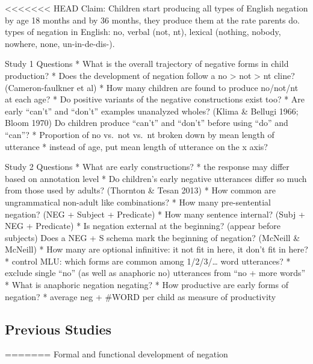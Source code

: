 \documentclass[man,floatsintext,draftall]{apa6}
\begin{document}
<<<<<<< HEAD
Claim: Children start producing all types of English negation by age 18
months and by 36 months, they produce them at the rate parents do. types
of negation in English: no, verbal (not, nt), lexical (nothing, nobody,
nowhere, none, un-in-de-dis-).

Study 1 Questions * What is the overall trajectory of negative forms in
child production? * Does the development of negation follow a no
\textgreater{} not \textgreater{} nt cline? (Cameron-faulkner et al) *
How many children are found to produce no/not/nt at each age? * Do
positive variants of the negative constructions exist too? * Are early
\enquote{can't} and \enquote{don't} examples unanalyzed wholes? (Klima
\& Bellugi 1966; Bloom 1970) Do children produce \enquote{can't} and
\enquote{don't} before using \enquote{do} and \enquote{can}? *
Proportion of no vs.~not vs.~nt broken down by mean length of utterance
* instead of age, put mean length of utterance on the x axis?

Study 2 Questions * What are early constructions? * the response may
differ based on annotation level * Do children's early negative
utterances differ so much from those used by adults? (Thornton \& Tesan
2013) * How common are ungrammatical non-adult like combinations? * How
many pre-sentential negation? (NEG + Subject + Predicate) * How many
sentence internal? (Subj + NEG + Predicate) * Is negation external at
the beginning? (appear before subjects) Does a NEG + S schema mark the
beginning of negation? (McNeill \& McNeill) * How many are optional
infinitive: it not fit in here, it don't fit in here? * control MLU:
which forms are common among 1/2/3/\ldots{} word utterances? * exclude
single \enquote{no} (as well as anaphoric no) utterances from
\enquote{no + more words} * What is anaphoric negation negating? * How
productive are early forms of negation? * average neg + \#WORD per child
as measure of productivity

\subsection{Previous Studies}\label{previous-studies}
=======
Formal and functional development of negation
\end{document}
